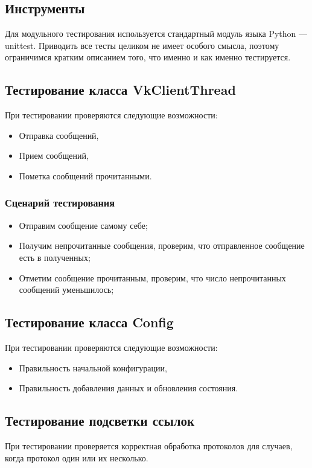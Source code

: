 \documentclass[12pt]{article}
\begin{document}
\subsection{Инструменты}

Для модульного тестирования используется стандартный модуль языка Python --- unittest. Приводить все тесты целиком не имеет особого смысла, поэтому ограничимся кратким описанием того, что именно и как именно тестируется.
\subsection{Тестирование класса VkClientThread}
При тестировании проверяются следующие возможности:
\begin{itemize}
\setlength{\itemsep}{-1mm}
\item Отправка сообщений,
\item Прием сообщений,
\item Пометка сообщений прочитанными.
\end{itemize}

\subsubsection{Сценарий тестирования}
\begin{itemize}
\setlength{\itemsep}{-1mm}
\item Отправим сообщение самому себе;
\item Получим непрочитанные сообщения, проверим, что отправленное сообщение есть в полученных;
\item Отметим сообщение прочитанным, проверим, что число непрочитанных сообщений уменьшилось;
\end{itemize}

\subsection{Тестирование класса Config}
При тестировании проверяются следующие возможности:
\begin{itemize}
\setlength{\itemsep}{-1mm}
\item Правильность начальной конфигурации,
\item Правильность добавления данных и обновления состояния.
\end{itemize}

\subsection{Тестирование подсветки ссылок}
При тестировании проверяется корректная обработка протоколов для случаев, когда протокол один или их несколько.
\end{document}

